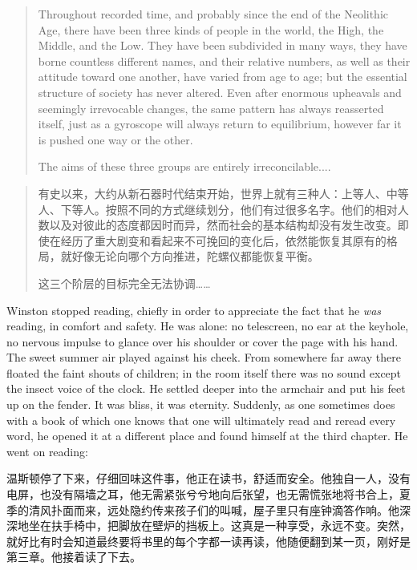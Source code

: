 \begin{paracol}{2}
\begin{quotation}
Throughout recorded time, and probably since the end of the Neolithic
Age, there have been three kinds of people in the world, the High, the
Middle, and the Low. They have been subdivided in many ways, they have
borne countless different names, and their relative numbers, as well as
their attitude toward one another, have varied from age to age; but the
essential structure of society has never altered. Even after enormous
upheavals and seemingly irrevocable changes, the same pattern has always
reasserted itself, just as a gyroscope will always return to
equilibrium, however far it is pushed one way or the other.\par
The aims of these three groups are entirely irreconcilable....
\end{quotation}

\switchcolumn

\begin{quotation}
有史以来，大约从新石器时代结束开始，世界上就有三种人：上等人、中等人、下等人。按照不同的方式继续划分，他们有过很多名字。他们的相对人数以及对彼此的态度都因时而异，然而社会的基本结构却没有发生改变。即使在经历了重大剧变和看起来不可挽回的变化后，依然能恢复其原有的格局，就好像无论向哪个方向推进，陀螺仪都能恢复平衡。\par
这三个阶层的目标完全无法协调\ldots\ldots{}
\end{quotation}

\switchcolumn*

Winston stopped reading, chiefly in order to appreciate the fact that he
\emph{was} reading, in comfort and safety. He was alone: no telescreen,
no ear at the keyhole, no nervous impulse to glance over his shoulder or
cover the page with his hand. The sweet summer air played against his
cheek. From somewhere far away there floated the faint shouts of
children; in the room itself there was no sound except the insect voice
of the clock. He settled deeper into the armchair and put his feet up on
the fender. It was bliss, it was eternity. Suddenly, as one sometimes
does with a book of which one knows that one will ultimately read and
reread every word, he opened it at a different place and found himself
at the third chapter. He went on reading:

\switchcolumn

温斯顿停了下来，仔细回味这件事，他正在读书，舒适而安全。他独自一人，没有电屏，也没有隔墙之耳，他无需紧张兮兮地向后张望，也无需慌张地将书合上，夏季的清风扑面而来，远处隐约传来孩子们的叫喊，屋子里只有座钟滴答作响。他深深地坐在扶手椅中，把脚放在壁炉的挡板上。这真是一种享受，永远不变。突然，就好比有时会知道最终要将书里的每个字都一读再读，他随便翻到某一页，刚好是第三章。他接着读了下去。


\end{paracol}

